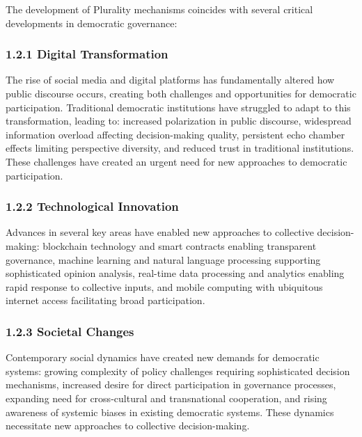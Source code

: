 The development of Plurality mechanisms coincides with several critical developments in democratic governance:

\hypertarget{digital-transformation}{%
\subsubsection{1.2.1 Digital Transformation}\label{digital-transformation}}

The rise of social media and digital platforms has fundamentally altered how public discourse occurs, creating both challenges and opportunities for democratic participation. Traditional democratic institutions have struggled to adapt to this transformation, leading to: increased polarization in public discourse, widespread information overload affecting decision-making quality, persistent echo chamber effects limiting perspective diversity, and reduced trust in traditional institutions. These challenges have created an urgent need for new approaches to democratic participation.

\hypertarget{technological-innovation}{%
\subsubsection{1.2.2 Technological Innovation}\label{technological-innovation}}

Advances in several key areas have enabled new approaches to collective decision-making: blockchain technology and smart contracts enabling transparent governance, machine learning and natural language processing supporting sophisticated opinion analysis, real-time data processing and analytics enabling rapid response to collective inputs, and mobile computing with ubiquitous internet access facilitating broad participation.

\hypertarget{societal-changes}{%
\subsubsection{1.2.3 Societal Changes}\label{societal-changes}}

Contemporary social dynamics have created new demands for democratic systems: growing complexity of policy challenges requiring sophisticated decision mechanisms, increased desire for direct participation in governance processes, expanding need for cross-cultural and transnational cooperation, and rising awareness of systemic biases in existing democratic systems. These dynamics necessitate new approaches to collective decision-making.

